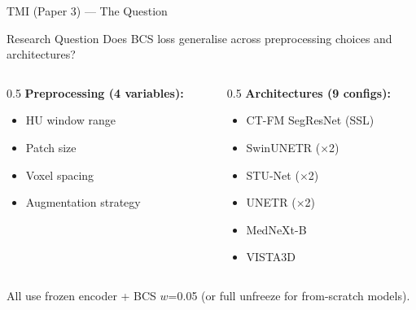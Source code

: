 \documentclass[aspectratio=169,10pt]{beamer}
\begin{document}
\begin{frame}{TMI (Paper 3) --- The Question}

\begin{block}{Research Question}
Does BCS loss generalise across preprocessing choices and architectures?
\end{block}

\vspace{0.3cm}
\begin{columns}
\begin{column}{0.5\textwidth}
\textbf{Preprocessing (4 variables):}
\begin{itemize}
    \item HU window range
    \item Patch size
    \item Voxel spacing
    \item Augmentation strategy
\end{itemize}
\end{column}
\begin{column}{0.5\textwidth}
\textbf{Architectures (9 configs):}
\begin{itemize}
    \item CT-FM SegResNet (SSL)
    \item SwinUNETR ($\times$2)
    \item STU-Net ($\times$2)
    \item UNETR ($\times$2)
    \item MedNeXt-B
    \item VISTA3D
\end{itemize}
\end{column}
\end{columns}

\vspace{0.3cm}
All use frozen encoder + BCS $w$=0.05 (or full unfreeze for from-scratch models).

\end{frame}
\end{document}
